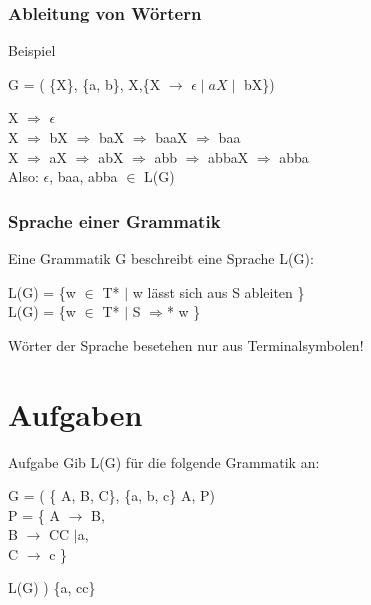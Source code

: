 \documentclass{beamer}
\begin{document}
\begin{frame}
	\frametitle{Ableitung von W\"ortern}
	\begin{example}{Beispiel}
		\begin{center}
			G = ( \{X\}, \{a, b\}, X,\{X $\rightarrow$ $\epsilon \mid aX \mid$ bX\})
		\end{center}

		X $\Rightarrow$ $\epsilon$ \\
		X $\Rightarrow$ bX $\Rightarrow$ baX $\Rightarrow$ baaX $\Rightarrow$ baa \\
		X $\Rightarrow$ aX $\Rightarrow$ abX $\Rightarrow$ abb $\Rightarrow$ abbaX $\Rightarrow$ abba  \\

		Also: $\epsilon$, baa, abba $\in$ L(G)

	\end{example}
\end{frame}

\begin{frame}
	\frametitle{Sprache einer Grammatik}
	Eine Grammatik G beschreibt eine Sprache L(G):
	\begin{center}
		L(G) = \{w $\in$ T* $\mid$ w l\"asst sich aus S ableiten  \} \\
		L(G) = \{w $\in$ T* $\mid$ S $\Rightarrow$* w \}
	\end{center}
	W\"orter der Sprache besetehen nur aus Terminalsymbolen!
\end{frame}

\section{Aufgaben}
\begin{frame}
	\begin{block}{Aufgabe}
	Gib L(G) f\"ur die folgende Grammatik an:
	\begin{center}
		G = ( \{ A, B, C\}, \{a, b, c\} A, P) \\
		P = \{ A $\rightarrow$ B, \\
			B $\rightarrow$ CC $\mid$a, \\
			C $\rightarrow$ c
			\}
	\end{center}
	\pause
	\begin{example}
	L(G) ) \{a, cc\}
	\end{example}
	\end{block}
\end{frame}
\end{document}
